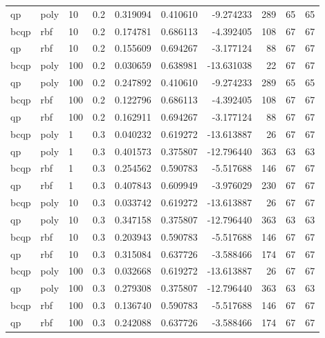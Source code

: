 \begin{tabular}{llllrrrrrr}
  qp &   poly &  10 &     0.2 &  0.319094 &  0.410610 &  -9.274233 &     289 &          65 &        65 \\
bcqp &    rbf &  10 &     0.2 &  0.174781 &  0.686113 &  -4.392405 &     108 &          67 &        67 \\
  qp &    rbf &  10 &     0.2 &  0.155609 &  0.694267 &  -3.177124 &      88 &          67 &        67 \\
bcqp &   poly & 100 &     0.2 &  0.030659 &  0.638981 & -13.631038 &      22 &          67 &        67 \\
  qp &   poly & 100 &     0.2 &  0.247892 &  0.410610 &  -9.274233 &     289 &          65 &        65 \\
bcqp &    rbf & 100 &     0.2 &  0.122796 &  0.686113 &  -4.392405 &     108 &          67 &        67 \\
  qp &    rbf & 100 &     0.2 &  0.162911 &  0.694267 &  -3.177124 &      88 &          67 &        67 \\
bcqp &   poly &   1 &     0.3 &  0.040232 &  0.619272 & -13.613887 &      26 &          67 &        67 \\
  qp &   poly &   1 &     0.3 &  0.401573 &  0.375807 & -12.796440 &     363 &          63 &        63 \\
bcqp &    rbf &   1 &     0.3 &  0.254562 &  0.590783 &  -5.517688 &     146 &          67 &        67 \\
  qp &    rbf &   1 &     0.3 &  0.407843 &  0.609949 &  -3.976029 &     230 &          67 &        67 \\
bcqp &   poly &  10 &     0.3 &  0.033742 &  0.619272 & -13.613887 &      26 &          67 &        67 \\
  qp &   poly &  10 &     0.3 &  0.347158 &  0.375807 & -12.796440 &     363 &          63 &        63 \\
bcqp &    rbf &  10 &     0.3 &  0.203943 &  0.590783 &  -5.517688 &     146 &          67 &        67 \\
  qp &    rbf &  10 &     0.3 &  0.315084 &  0.637726 &  -3.588466 &     174 &          67 &        67 \\
bcqp &   poly & 100 &     0.3 &  0.032668 &  0.619272 & -13.613887 &      26 &          67 &        67 \\
  qp &   poly & 100 &     0.3 &  0.279308 &  0.375807 & -12.796440 &     363 &          63 &        63 \\
bcqp &    rbf & 100 &     0.3 &  0.136740 &  0.590783 &  -5.517688 &     146 &          67 &        67 \\
  qp &    rbf & 100 &     0.3 &  0.242088 &  0.637726 &  -3.588466 &     174 &          67 &        67 \\
\bottomrule
\end{tabular}
